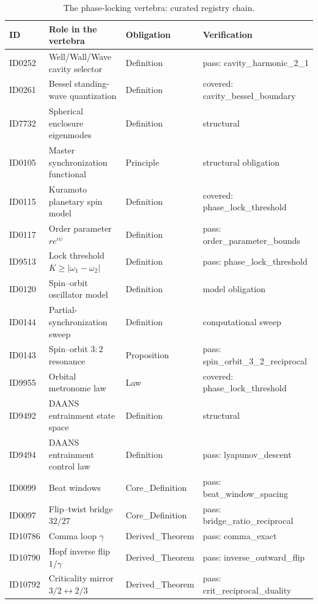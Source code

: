 \documentclass[11pt]{article}
\theoremstyle{remark}
\begin{document}
\begin{table}[ht]
\centering
\small
\caption{The phase-locking vertebra: curated registry chain.}
\label{tab:chain}
\begin{tabular}{llll}
\toprule
ID & Role in the vertebra & Obligation & Verification \\
\midrule
ID0252 & Well/Wall/Wave cavity selector & Definition & pass: cavity\_harmonic\_2\_1 \\
ID0261 & Bessel standing-wave quantization & Definition & covered: cavity\_bessel\_boundary \\
ID7732 & Spherical enclosure eigenmodes & Definition & structural \\
ID0105 & Master synchronization functional & Principle & structural obligation \\
ID0115 & Kuramoto planetary spin model & Definition & covered: phase\_lock\_threshold \\
ID0117 & Order parameter $r e^{i\psi}$ & Definition & pass: order\_parameter\_bounds \\
ID9513 & Lock threshold $K \geq |\omega_1 - \omega_2|$ & Definition & pass: phase\_lock\_threshold \\
ID0120 & Spin--orbit oscillator model & Definition & model obligation \\
ID0144 & Partial-synchronization sweep & Definition & computational sweep \\
ID0143 & Spin--orbit $3{:}2$ resonance & Proposition & pass: spin\_orbit\_3\_2\_reciprocal \\
ID9955 & Orbital metronome law & Law & covered: phase\_lock\_threshold \\
ID9492 & DAANS entrainment state space & Definition & structural \\
ID9494 & DAANS entrainment control law & Definition & pass: lyapunov\_descent \\
ID0099 & Beat windows & Core\_Definition & pass: beat\_window\_spacing \\
ID0097 & Flip--twist bridge $32/27$ & Core\_Definition & pass: bridge\_ratio\_reciprocal \\
ID10786 & Comma loop $\gamma$ & Derived\_Theorem & pass: comma\_exact \\
ID10790 & Hopf inverse flip $1/\gamma$ & Derived\_Theorem & pass: inverse\_outward\_flip \\
ID10792 & Criticality mirror $3/2 \leftrightarrow 2/3$ & Derived\_Theorem & pass: crit\_reciprocal\_duality \\
\bottomrule
\end{tabular}
\end{table}
\end{document}
